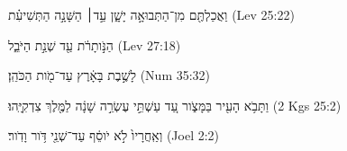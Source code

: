 
\begin{exe}

\ex\label{antdur_end_exs1}
\texthebrew{
וַאֲכַלְתֶּ֖ם מִן־הַתְּבוּאָ֣ה יָשָׁ֑ן עַ֣ד׀ הַשָּׁנָ֣ה הַתְּשִׁיעִ֗ת 
} (Lev 25:22)

\ex\label{antdur_end_exs2}
\texthebrew{
הַנֹּ֣ותָרֹ֔ת עַ֖ד שְׁנַ֣ת הַיֹּבֵ֑ל 
} (Lev 27:18)

\ex\label{antdur_end_exs3}
\texthebrew{
לָשֶׁ֣בֶת בָּאָ֔רֶץ עַד־מֹ֖ות הַכֹּהֵֽן׃ 
} (Num 35:32)

\ex\label{antdur_end_exs4}
\texthebrew{
וַתָּבֹ֥א הָעִ֖יר בַּמָּצֹ֑ור עַ֚ד עַשְׁתֵּ֣י עֶשְׂרֵ֣ה שָׁנָ֔ה לַמֶּ֖לֶךְ צִדְקִיָּֽהוּ׃ 
} (2 Kgs 25:2)

\ex\label{antdur_end_exs5}
\texthebrew{
וְאַֽחֲרָיו֙ לֹ֣א יֹוסֵ֔ף עַד־שְׁנֵ֖י דֹּ֥ור וָדֹֽור׃ 
} (Joel 2:2)

\end{exe}
